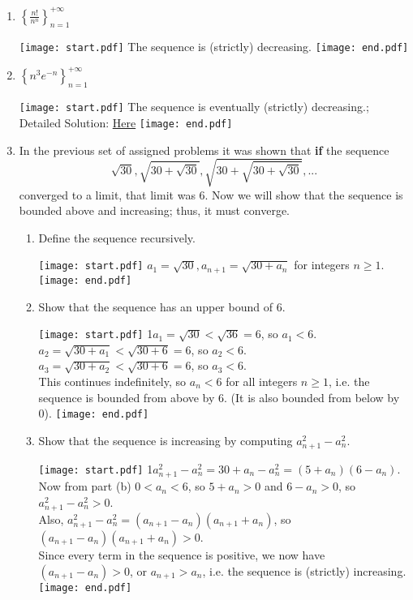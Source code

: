 \documentclass[12pt]{article}
\begin{document}
\begin{enumerate}
\item $\left\{ \frac{n!}{n^n} \right\}_{n = 1}^{+\infty}$

\texttt{[image: start.pdf]}
{{The sequence is (strictly) decreasing.}}
\texttt{[image: end.pdf]}


\item $\left\{ n^3 e^{-n} \right\}_{n = 1}^{+\infty}$

\texttt{[image: start.pdf]}
{{The sequence is eventually (strictly) decreasing.; Detailed Solution: \textcolor{blue}{\href{http://www.math.drexel.edu/classes/Calculus/resources/Math123HW/Solutions/123_06_Monotone_Sequences_17.pdf}{Here}}}}
\texttt{[image: end.pdf]}



\item In the previous set of assigned problems it was shown that {\bf if} the sequence $$\sqrt{30}, \sqrt{30+\sqrt{30}}, \sqrt{30+\sqrt{30+\sqrt{30}}}, ... $$ converged to a limit, that limit was  $6$.  Now we will
show that the sequence is bounded above and increasing; thus, it must converge.

\begin{enumerate}

\item Define the sequence recursively.

\texttt{[image: start.pdf]}
{{$a_1=\sqrt{30}, a_{n+1}=\sqrt{30+a_n}$ for integers $n\geq1$.}}
\texttt{[image: end.pdf]}


\item Show that the sequence has an upper bound of $6$.

\texttt{[image: start.pdf]}
{{{1\linewidth}{$a_1=\sqrt{30}<\sqrt{36}=6$, so $a_1<6$.
\\ $a_2=\sqrt{30+a_1}<\sqrt{30+6}=6$, so $a_2<6$.
\\ $a_3=\sqrt{30+a_2}<\sqrt{30+6}=6$, so $a_3<6$.
\\ This continues indefinitely, so $a_n<6$ for all integers $n\geq1$, i.e. the sequence is bounded from above by 6.  (It is also bounded from below by 0). }}}
\texttt{[image: end.pdf]}


\item Show that the sequence is increasing by computing $a_{n+1}^2-a_n^2$.

\texttt{[image: start.pdf]}
{{{1\linewidth}{$a_{n+1}^2-a_n^2 = 30 + a_n - a_n^2 = (5+a_n)(6-a_n)$. 
\\ Now from part (b) $0<a_n<6$, so $5+a_n>0$ and $6-a_n>0$, so $a_{n+1}^2-a_n^2 > 0$.
\\ Also, $a_{n+1}^2-a_n^2=(a_{n+1}-a_n)(a_{n+1}+a_n)$, so $(a_{n+1}-a_n)(a_{n+1}+a_n) > 0$.
\\ Since every term in the sequence is positive, we now have $(a_{n+1}-a_n)>0$, or $a_{n+1}>a_n$, i.e. the sequence is (strictly) increasing.    }}}
\texttt{[image: end.pdf]}


\end{enumerate}

\end{enumerate}
\end{document}
